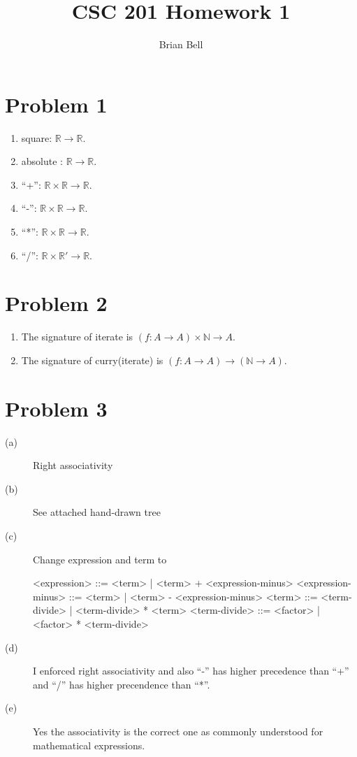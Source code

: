 \documentclass[11pt]{article}
\begin{document}
\title{CSC 201 Homework 1}
\author{Brian Bell\\
}
\renewcommand{\today}{February 8, 2009}
\maketitle

\section*{Problem 1}
\begin{enumerate}
\item square: $\mathbb{R} \rightarrow \mathbb{R}$.
\item absolute : $\mathbb{R} \rightarrow \mathbb{R}$.
\item ``+'': $\mathbb{R} \times \mathbb{R} \rightarrow \mathbb{R}$.
\item ``-'': $\mathbb{R} \times \mathbb{R} \rightarrow \mathbb{R}$.
\item ``*'': $\mathbb{R} \times \mathbb{R} \rightarrow \mathbb{R}$.
\item ``/'': $\mathbb{R} \times \mathbb{R'} \rightarrow \mathbb{R}$.
  
\end{enumerate}

\section*{Problem 2}
\begin{enumerate}
\item The signature of iterate is $(f:A \rightarrow A) \times \mathbb{N} \rightarrow A.$
\item The signature of curry(iterate) is $(f: A \rightarrow A) \rightarrow (\mathbb{N} \rightarrow A).$
\end{enumerate}
\section*{Problem 3}
\begin{description}
\item[(a)] Right associativity
\item[(b)] See attached hand-drawn tree
\item[(c)] Change expression and term to \newline \newline
\begin{center}
<expression> ::= <term> | <term> + <expression-minus>
<expression-minus> ::= <term> | <term> - <expression-minus>
<term> ::= <term-divide> | <term-divide> * <term>
<term-divide> ::= <factor> | <factor> * <term-divide>
\end{center}
\item[(d)] I enforced right associativity and also ``-'' has higher precedence than ``+'' and ``/'' has higher precendence than ``*''.
\item[(e)] Yes the associativity is the correct one as commonly understood for mathematical expressions.
\end{description}
\end{document}
